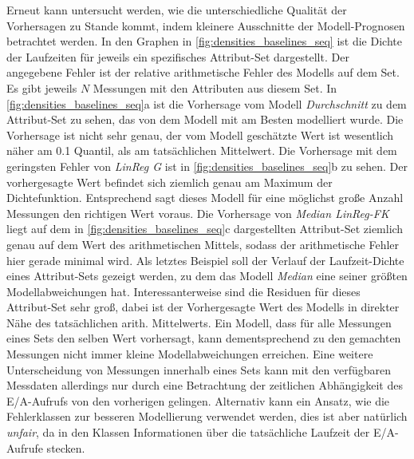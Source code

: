 \documentclass[
	12pt,
	a4paper,
	BCOR10mm,
	DIV14,
	listof=totoc,
	bibliography=totoc,
	headsepline
]{scrreprt}
\begin{document}
Erneut kann untersucht werden, wie die unterschiedliche Qualität der Vorhersagen zu Stande kommt, indem kleinere Ausschnitte der Modell-Prognosen betrachtet werden.
In den Graphen in \ref{fig:densities_baselines_seq} ist die Dichte der Laufzeiten für jeweils ein spezifisches Attribut-Set dargestellt. Der angegebene Fehler ist der relative arithmetische Fehler des Modells auf dem Set.
Es gibt jeweils $N$ Messungen mit den Attributen aus diesem Set.
In \ref{fig:densities_baselines_seq}a ist die Vorhersage vom Modell \textit{Durchschnitt} zu dem Attribut-Set zu sehen, das von dem Modell mit am Besten modelliert wurde.
Die Vorhersage ist nicht sehr genau, der vom Modell geschätzte Wert ist wesentlich näher am 0.1 Quantil, als am tatsächlichen Mittelwert.
Die Vorhersage mit dem geringsten Fehler von \textit{LinReg G} ist in \ref{fig:densities_baselines_seq}b zu sehen.
Der vorhergesagte Wert befindet sich ziemlich genau am Maximum der Dichtefunktion. Entsprechend sagt dieses Modell für eine möglichst große Anzahl Messungen den richtigen Wert voraus. 
Die Vorhersage von \textit{Median LinReg-FK} liegt auf dem in \ref{fig:densities_baselines_seq}c dargestellten Attribut-Set ziemlich genau auf dem Wert des arithmetischen Mittels, sodass der arithmetische Fehler hier gerade minimal wird.
Als letztes Beispiel soll der Verlauf der Laufzeit-Dichte eines Attribut-Sets gezeigt werden, zu dem das Modell \textit{Median} eine seiner größten Modellabweichungen hat.
Interessanterweise sind die Residuen für dieses Attribut-Set sehr groß, dabei ist der Vorhergesagte Wert des Modells in direkter Nähe des tatsächlichen arith. Mittelwerts.
Ein Modell, dass für alle Messungen eines Sets den selben Wert vorhersagt, kann dementsprechend zu den gemachten Messungen nicht immer kleine Modellabweichungen erreichen.
Eine weitere Unterscheidung von Messungen innerhalb eines Sets kann mit den verfügbaren Messdaten allerdings nur durch eine Betrachtung der zeitlichen Abhängigkeit des E/A-Aufrufs von den vorherigen gelingen. 
Alternativ kann ein Ansatz, wie die Fehlerklassen zur besseren Modellierung verwendet werden, dies ist aber natürlich \textit{unfair}, da in den Klassen Informationen über die tatsächliche Laufzeit der E/A-Aufrufe stecken.
 
\end{document}
